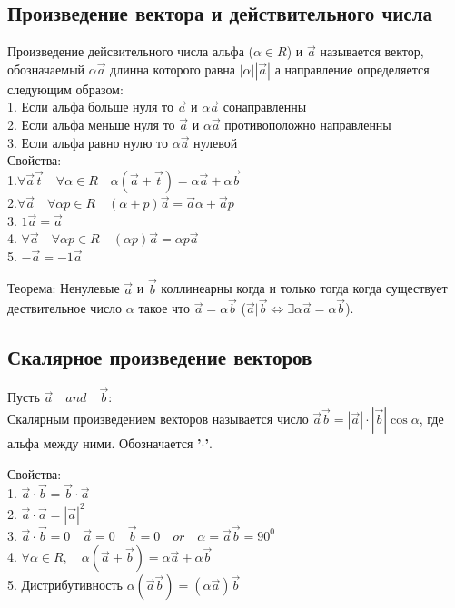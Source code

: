\documentclass[a4paper, 12pt]{article}
\begin{document}
\subsection{Произведение вектора и действительного числа}
Произведение дейсвительного числа альфа ($ \alpha \in R $) и $ \vec{a} $ называется вектор, обозначаемый $ \alpha\vec{a} $ длинна которого равна $ |\alpha||\vec{a}| $ а направление определяется следующим образом:\\
1. Если альфа больше нуля то $ \vec{a} $ и $ \alpha\vec{a} $ сонаправленны\\
2. Если альфа меньше нуля то $ \vec{a} $ и $ \alpha\vec{a} $ противоположно направленны\\
3. Если альфа равно нулю то  $ \alpha\vec{a} $ нулевой\\
Свойства:\\
1.$\forall \vec{a}\vec{t} \quad\forall \alpha \in R \quad\alpha(\vec{a}+ \vec{t}) = \alpha \vec{a} + \alpha \vec{b}$\\
2.$  \forall \vec{a} \quad\forall \alpha p\in R  \quad(\alpha + p)\vec{a} = \vec{a} \alpha + \vec{a}p$\\
3. $  1 \vec{a} = \vec{a} $\\
4. $  \forall \vec{a} \quad\forall \alpha p \in R  \quad(\alpha p)\vec{a}= \alpha p\vec{a}$\\
5. $  -\vec{a} = -1\vec{a} $\\
\begin{mdframed}[backgroundcolor=blue!20] 
       Теорема: Ненулевые $ \vec{a} $ и $ \vec{b} $ коллинеарны когда и только тогда когда существует дествительное число $ \alpha $ такое что $ \vec{a} = \alpha\vec{b} $ ($\vec{a}|\vec{b} \Leftrightarrow \exists \alpha \vec{a} = \alpha\vec{b}$).
    \end{mdframed}



\subsection{Скалярное произведение векторов}
Пусть $ \vec{a} \quad and \quad \vec{b} $:\\
Скалярным произведением векторов называется число $ \vec{a} \vec{b} = |\vec{a}|\cdot |\vec{b}|\cos \alpha $, где альфа между ними. Обозначается \textbf{'$ \cdot $'}.

Свойства:\\
1. $ \vec{a} \cdot \vec{b} = \vec{b} \cdot \vec{a} $\\
2. $ \vec{a} \cdot \vec{a} = |\vec{a}|^2 $\\
3. $ \vec{a} \cdot \vec{b} = 0 \quad \vec{a} = 0 \quad \vec{b} = 0 \quad or \quad \alpha = \vec{a}  \vec{b} = 90^0 $ \\
4. $ \forall \alpha \in R, \quad \alpha(\vec{a}+ \vec{b}) = \alpha \vec{a} + \alpha \vec{b}$\\
5. Дистрибутивность $ \alpha(\vec{a}\vec{b}) = (\alpha \vec{a}) \vec{b}$
\end{document}
